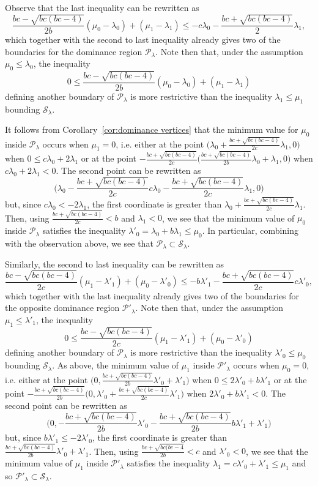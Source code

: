 \documentclass[pdflatex,sn-mathphys]{sn-jnl}%
\theoremstyle{thmstyleone}%
\theoremstyle{thmstyletwo}%
\theoremstyle{thmstylethree}%
\newcommand{\cP}{\mathcal{P}}
\newcommand{\cS}{\mathcal{S}}
\begin{document}
  Observe that the last inequality can be rewritten as
  \[ \frac{b c-\sqrt{b c (b c-4)}}{2 b}(\mu_0-\lambda_0) + (\mu_1-\lambda_1) \leq -c\lambda_0 - \frac{b c + \sqrt{b c (b c-4)}}{2 } \lambda_1,\]
  which together with the second to last inequality already gives two of the boundaries for the dominance region $\cP_\lambda$.
  Note then that, under the assumption $\mu_0\leq\lambda_0$, the inequality 
  \[0 \leq \frac{b c-\sqrt{b c (b c-4)}}{2 b}(\mu_0-\lambda_0)+(\mu_1-\lambda_1)\]
  defining another boundary of $\cP_\lambda$ is more restrictive than the inequality $\lambda_1\leq\mu_1$ bounding $\cS_\lambda$.

  It follows from Corollary~\ref{cor:dominance vertices} that the minimum value for $\mu_0$ inside $\cP_\lambda$ occurs when $\mu_1=0$, i.e. either at the point $\big( \lambda_0+\frac{bc+\sqrt{bc(bc-4)}}{2c}\lambda_1 , 0 \big)$ when $0 \leq c\lambda_0+2\lambda_1$ or at the point $-\frac{bc+\sqrt{bc(bc-4)}}{2c} \big( \frac{bc+\sqrt{bc(bc-4)}}{2b}\lambda_0+\lambda_1 , 0 \big)$ when $c\lambda_0+2\lambda_1<0$.
  The second point can be rewritten as
  \[\big(\lambda_0 -\frac{bc+\sqrt{bc(bc-4)}}{2c} c\lambda_0-\frac{bc+\sqrt{bc(bc-4)}}{2c} \lambda_1 , 0 \big)\]
  but, since $c\lambda_0 < -2\lambda_1$, the first coordinate is greater than $\lambda_0+\frac{bc+\sqrt{bc(bc-4)}}{2c}\lambda_1$.
  Then, using $\frac{bc+\sqrt{bc(bc-4)}}{2c}<b$ and $\lambda_1<0$, we see that the minimum value of $\mu_0$ inside $\cP_\lambda$ satisfies the inequality $\lambda'_0=\lambda_0+b\lambda_1 \leq \mu_0$.
  In particular, combining with the observation above, we see that $\cP_\lambda\subset\cS_\lambda$.

  Similarly, the second to last inequality can be rewritten as
  \[ \frac{b c-\sqrt{b c (b c-4)}}{2 c}(\mu_1-\lambda'_1)+(\mu_0-\lambda'_0) \leq -b\lambda'_1-\frac{b c+\sqrt{b c (b c-4)}}{2c}c\lambda'_0,\]
  which together with the last inequality already gives two of the boundaries for the opposite dominance region $\cP'_\lambda$.
  Note then that, under the assumption $\mu_1\leq\lambda'_1$, the inequality
  \[ 0 \leq \frac{b c-\sqrt{b c (b c-4)}}{2 c}(\mu_1-\lambda'_1)+(\mu_0-\lambda'_0) \]
  defining another boundary of $\cP_\lambda$ is more restrictive than the inequality $\lambda'_0\leq\mu_0$ bounding $\cS_\lambda$.
  As above, the minimum value of $\mu_1$ inside $\cP'_\lambda$ occurs when $\mu_0=0$, i.e. either at the point $\big(0, \frac{bc+\sqrt{bc(bc-4)}}{2b}\lambda'_0+\lambda'_1 \big)$
  when $0 \leq 2\lambda'_0+b\lambda'_1$ or at the point $-\frac{bc+\sqrt{bc(bc-4)}}{2b} \big(0, \lambda'_0+\frac{bc+\sqrt{bc(bc-4)}}{2c}\lambda'_1 \big)$
  when $2\lambda'_0+b\lambda'_1<0$.
  The second point can be rewritten as
  \[\big(0, -\frac{bc+\sqrt{bc(bc-4)}}{2b} \lambda'_0-\frac{bc+\sqrt{bc(bc-4)}}{2b} b\lambda'_1+\lambda'_1 \big)\]
  but, since $b\lambda'_1\le -2\lambda'_0$, the first coordinate is greater than $\frac{bc+\sqrt{bc(bc-4)}}{2b}\lambda'_0+\lambda'_1$.
  Then, using $\frac{bc+\sqrt{bc(bc-4}}{2b}<c$ and $\lambda'_0<0$, we see that the minimum value of $\mu_1$ inside $\cP'_\lambda$ satisfies the inequality $\lambda_1=c\lambda'_0+\lambda'_1\le\mu_1$ and so $\cP'_\lambda\subset\cS_\lambda$.
\end{document}
